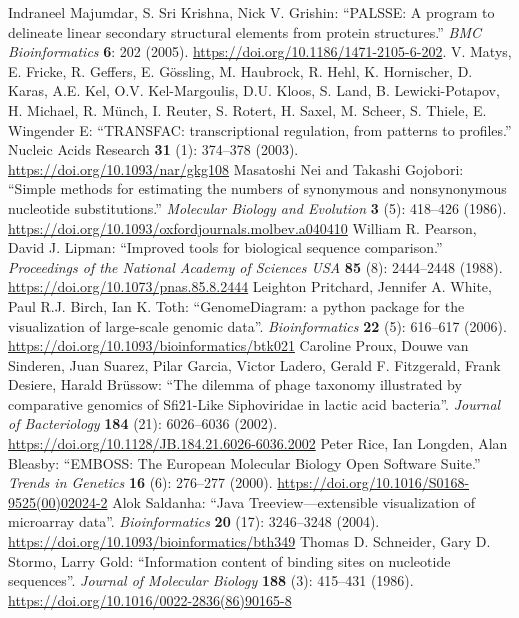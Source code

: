 \documentclass{report}
\begin{document}
\begin{thebibliography}{99}
Indraneel Majumdar, S. Sri Krishna, Nick V. Grishin: ``PALSSE: A program to delineate linear secondary structural elements from protein structures.'' \textit{BMC Bioinformatics} {\bf 6}: 202 (2005). \url{https://doi.org/10.1186/1471-2105-6-202}.
V. Matys, E. Fricke, R. Geffers, E. G\"ossling, M. Haubrock, R. Hehl, K. Hornischer, D. Karas, A.E. Kel, O.V. Kel-Margoulis, D.U. Kloos, S. Land, B. Lewicki-Potapov, H. Michael, R. M\"unch, I. Reuter, S. Rotert, H. Saxel, M. Scheer, S. Thiele, E. Wingender E: ``TRANSFAC: transcriptional regulation, from patterns to profiles.'' Nucleic Acids Research {\bf 31} (1): 374--378 (2003).  \url{https://doi.org/10.1093/nar/gkg108}
Masatoshi Nei and Takashi Gojobori: ``Simple methods for estimating the numbers of synonymous and nonsynonymous nucleotide substitutions.'' \textit{Molecular Biology and Evolution} {\bf 3} (5): 418--426 (1986). \url{https://doi.org/10.1093/oxfordjournals.molbev.a040410}
William R. Pearson, David J. Lipman: ``Improved tools for biological sequence comparison.'' \textit{Proceedings of the National Academy of Sciences USA} {\bf 85} (8): 2444--2448 (1988).
\url{https://doi.org/10.1073/pnas.85.8.2444}
Leighton Pritchard, Jennifer A. White, Paul R.J. Birch, Ian K. Toth: ``GenomeDiagram: a python package for the visualization of large-scale genomic data''. \textit{Bioinformatics} {\bf 22} (5): 616--617 (2006).
\url{https://doi.org/10.1093/bioinformatics/btk021}
Caroline Proux, Douwe van Sinderen, Juan Suarez, Pilar Garcia, Victor Ladero, Gerald F. Fitzgerald, Frank Desiere, Harald Br\"ussow:
``The dilemma of phage taxonomy illustrated by comparative genomics of Sfi21-Like Siphoviridae in lactic acid bacteria''. \textit{Journal of Bacteriology} {\bf 184} (21): 6026--6036 (2002).
\url{https://doi.org/10.1128/JB.184.21.6026-6036.2002}
Peter Rice, Ian Longden, Alan Bleasby: ``EMBOSS: The European Molecular Biology Open Software Suite.'' \textit{Trends in Genetics} {\bf 16} (6): 276--277 (2000).
\url{https://doi.org/10.1016/S0168-9525(00)02024-2}
Alok Saldanha: ``Java Treeview---extensible visualization of microarray data''. \textit{Bioinformatics} {\bf 20} (17): 3246--3248 (2004).
\url{https://doi.org/10.1093/bioinformatics/bth349}
Thomas D. Schneider, Gary D. Stormo, Larry Gold: ``Information content of binding sites on nucleotide sequences''. \textit{Journal of Molecular Biology} {\bf 188} (3): 415--431 (1986). \url{https://doi.org/10.1016/0022-2836(86)90165-8}

\end{thebibliography}
\end{document}
